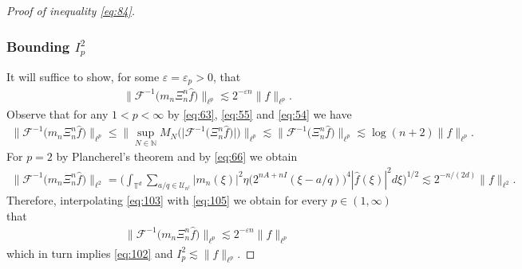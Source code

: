 \documentclass[a4paper,oneside]{amsart}
\theoremstyle{plain}
\theoremstyle{definition}
\numberwithin{equation}{section}
\theoremstyle{plain}
\newcommand{\TT}{\mathbb{T}}
\newcommand{\NN}{\mathbb{N}}
\newcommand{\8}{\infty}
\begin{document}
\begin{proof}[Proof of inequality \eqref{eq:84}]
\subsubsection{Bounding $I_p^2$} It will suffice to show, for some
$\varepsilon=\varepsilon_{p}>0$, that
\begin{align}
  \label{eq:102}
  \big\|\mathcal
  F^{-1}\big(m_n\Xi_{n}^{n}\hat{f}\big)\big\|_{\ell^p}\lesssim 2^{-\varepsilon n}\|f\|_{\ell^p}.
\end{align}
Observe that for any $1<p<\infty$ by \eqref{eq:63}, \eqref{eq:55} and \eqref{eq:54} we have
\begin{align}
 \label{eq:103}\big\|\mathcal
  F^{-1}\big(m_n\Xi_{n}^{n}\hat{f}\big)\big\|_{\ell^p}\le\big\|\sup_{N\in\NN}
  M_N\big(\big|\mathcal
  F^{-1}\big(\Xi_{n}^{n}\hat{f}\big)\big|\big)\big\|_{\ell^p}\lesssim
\big\|\mathcal
  F^{-1}\big(\Xi_{n}^{n}\hat{f}\big)\big\|_{\ell^p}
  \lesssim \log (n+2)\|f\|_{\ell^p}.
\end{align}
 For $p=2$ by Plancherel's theorem and by \eqref{eq:66} we obtain
 \begin{multline}
   \label{eq:105}
   \big\|\mathcal
  F^{-1}\big(m_n\Xi_{n}^{n}\hat{f}\big)\big\|_{\ell^2}
=
\bigg(\int_{\TT^d}\sum_{a/q\in\mathscr U_{n^l}}|m_{n}(\xi)|^2\eta\big(2^{nA+nI}(\xi-a/q)\big)^4
  |\hat{f}(\xi)|^2d\xi\bigg)^{1/2}\lesssim 
2^{-n/(2d)}\|f\|_{\ell^2}.
 \end{multline}
Therefore, interpolating \eqref{eq:103} with \eqref{eq:105} we obtain
for every $p\in(1, \infty)$ that 
\begin{align*}
 \big\|\mathcal
  F^{-1}\big(m_n\Xi_{n}^{n}\hat{f}\big)\big\|_{\ell^p}\lesssim 2^{-\varepsilon n}\|f\|_{\ell^p}
\end{align*}
which in turn implies \eqref{eq:102} and $I_p^2\lesssim \|f\|_{\ell^p}$.

\end{proof}
\end{document}
